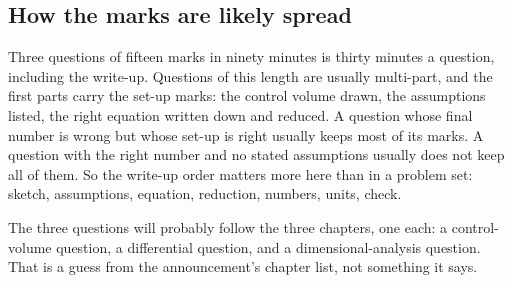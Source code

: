 \subsection*{How the marks are likely spread}

Three questions of fifteen marks in ninety minutes is thirty minutes a question, including the write-up. Questions of this length are usually multi-part, and the first parts carry the set-up marks: the control volume drawn, the assumptions listed, the right equation written down and reduced. A question whose final number is wrong but whose set-up is right usually keeps most of its marks. A question with the right number and no stated assumptions usually does not keep all of them. So the write-up order matters more here than in a problem set: sketch, assumptions, equation, reduction, numbers, units, check.

The three questions will probably follow the three chapters, one each: a control-volume question, a differential question, and a dimensional-analysis question. That is a guess from the announcement's chapter list, not something it says.
